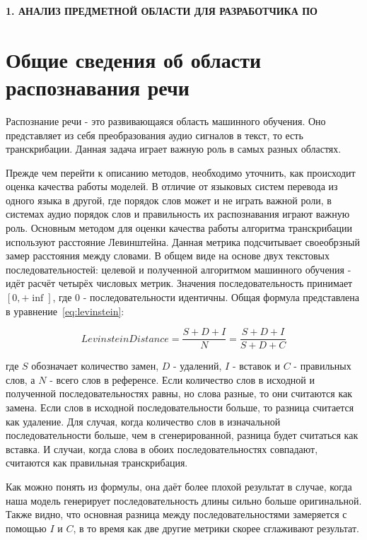 \newpage
\begin{center}
  \textbf{\large 1. АНАЛИЗ ПРЕДМЕТНОЙ ОБЛАСТИ ДЛЯ РАЗРАБОТЧИКА ПО}
\end{center}


\section{Общие сведения об области распознавания речи}

Распознание речи - это развивающаяся область машинного обучения.
Оно представляет из себя преобразования аудио сигналов в текст, то есть транскрибации.
Данная задача играет важную роль в самых разных областях.

Прежде чем перейти к описанию методов, необходимо уточнить, как происходит оценка качества работы моделей.
В отличие от языковых систем перевода из одного языка в другой, где порядок слов может и не играть важной роли, в системах аудио порядок слов и правильность их распознавания играют важную роль.
Основным методом для оценки качества работы алгоритма транскрибации используют расстояние Левинштейна.
Данная метрика подсчитывает своеобрзный замер расстояния между словами.
В общем виде на основе двух текстовых последовательностей: целевой и полученной алгоритмом машинного обучения - идёт расчёт четырёх числовых метрик.
Значения последовательность принимает $[0, +\inf]$, где 0 - последовательности идентичны.
Общая формула представлена в уравнение~\ref{eq:levinstein}:

\begin{equation}
  Levinstein Distance = \frac{S + D + I}{N} = \frac{S + D + I}{S + D + C}
  \label{eq:levinstein}
\end{equation}

где $S$ обозначает количество замен, $D$ - удалений, $I$ - вставок и $C$ - правильных слов, а $N$ - всего слов в референсе. 
Если количество слов в исходной и полученной последовательностях равны, но слова разные, то они считаются как замена. 
Если слов в исходной последовательности больше, то разница считается как удаление.
Для случая, когда количество слов в изначальной последовательности больше, чем в сгенерированной, разница будет считаться как вставка.
И случаи, когда слова в обоих последовательностях совпадают, считаются как правильная транскрибация.

Как можно понять из формулы, она даёт более плохой результат в случае, когда наша модель генерирует последовательность длины сильно больше оригинальной.
Также видно, что основная разница между последовательностями замеряется с помощью $I$ и $C$, в то время как две другие метрики скорее сглаживают результат.

